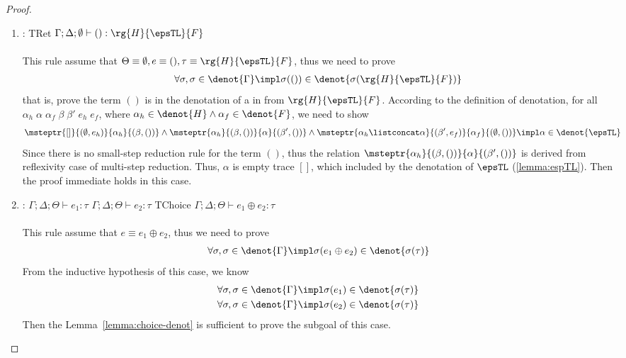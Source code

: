 \begin{proof}
\begin{enumerate}[label=Case]
\item:
{\footnotesize
\mprooftr{35mm}
{}
{TRet}
{$\Gamma; \Delta; \emptyset \vdash () : \rg{H}{\epsTL}{F}$}
\ \\ \ \\}
This rule assume that $\Theta \equiv \emptyset, e \equiv (), \tau \equiv \rg{H}{\epsTL}{F}$, thus we need to prove
{\footnotesize\begin{align*}
    \forall \sigma, \sigma \in \denot{\Gamma} \impl \sigma(()) \in \denot{\sigma(\rg{H}{\epsTL}{F})}
\end{align*}}\noindent
that is, prove the term $()$ is in the denotation of a \PAT in from $\rg{H}{\epsTL}{F}$. According to the definition of \PAT denotation, for all$\alpha_h\;\alpha\;\alpha_f\;\beta\;\beta'\;e_h\;e_f$, where $\alpha_h \in \denot{H} \land \alpha_f \in \denot{F}$, we need to show
{\footnotesize\begin{align*}
&\msteptr{[]}{(\emptyset, e_h)}{\alpha_h}{(\beta, ())}
\land \msteptr{\alpha_h}{(\beta, ())}{\alpha}{(\beta', ())}
\land \msteptr{\alpha_h \listconcat \alpha }{(\beta', e_f)}{\alpha_f}{(\emptyset, ())} \impl \alpha \in \denot{\epsTL}
\end{align*}}\noindent
Since there is no small-step reduction rule for the term $()$, thus the relation $\msteptr{\alpha_h}{(\beta, ())}{\alpha}{(\beta', ())}$ is derived from reflexivity case of multi-step reduction. Thus, $\alpha$ is empty trace $[]$, which included by the denotation of $\epsTL$ (\autoref{lemma:espTL}). Then the proof immediate holds in this case.

\item:
{\footnotesize
\mprooftr{21mm}
{
$\Gamma; \Delta; \Theta \vdash e_1 : \tau$ \quad $\Gamma; \Delta; \Theta \vdash e_2 : \tau$
 }
{TChoice}
{$\Gamma; \Delta; \Theta \vdash e_1 \oplus e_2 : \tau$}
\ \\ \ \\}
This rule assume that $e \equiv e_1 \oplus e_2$, thus we need to prove
{\footnotesize\begin{align*}
    \forall \sigma, \sigma \in \denot{\Gamma} \impl \sigma(e_1 \oplus e_2) \in \denot{\sigma(\tau)}
\end{align*}}\noindent
From the inductive hypothesis of this case, we know
{\footnotesize\begin{align*}
    &\forall \sigma, \sigma \in \denot{\Gamma} \impl \sigma(e_1) \in \denot{\sigma(\tau)}
    \\&\forall \sigma, \sigma \in \denot{\Gamma} \impl \sigma(e_2) \in \denot{\sigma(\tau)}
\end{align*}}\noindent
Then the Lemma~\ref{lemma:choice-denot} is sufficient to prove the subgoal of this case.


\end{enumerate}
\end{proof}
